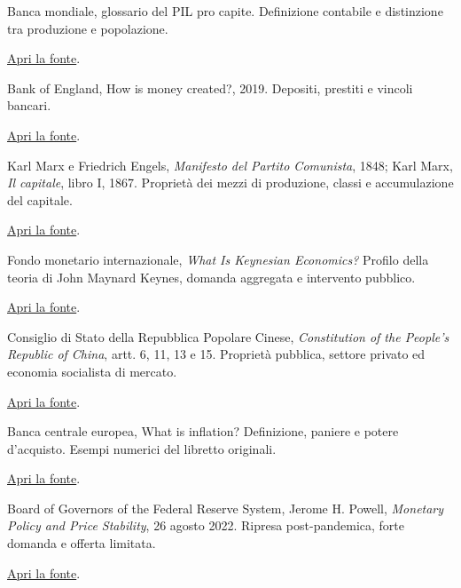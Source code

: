 \begin{enumerate}[label={[\arabic*]},itemsep=8pt]
\item\label{src:pil} Banca mondiale, glossario del PIL pro capite. Definizione contabile e distinzione tra produzione e popolazione.\par\href{https://databank.worldbank.org/metadataglossary/world-development-indicators/series/NY.GDP.PCAP.CN}{\small Apri la fonte}.
\item\label{src:moneta} Bank of England, How is money created?, 2019. Depositi, prestiti e vincoli bancari.\par\href{https://www.bankofengland.co.uk/explainers/how-is-money-created}{\small Apri la fonte}.
\item\label{src:marx} Karl Marx e Friedrich Engels, \emph{Manifesto del Partito Comunista}, 1848; Karl Marx, \emph{Il capitale}, libro I, 1867. Proprietà dei mezzi di produzione, classi e accumulazione del capitale.\par\href{https://www.marxists.org/archive/marx/works/1848/communist-manifesto/}{\small Apri la fonte}.
\item\label{src:keynes} Fondo monetario internazionale, \emph{What Is Keynesian Economics?} Profilo della teoria di John Maynard Keynes, domanda aggregata e intervento pubblico.\par\href{https://www.imf.org/external/pubs/ft/fandd/2014/09/basics.htm}{\small Apri la fonte}.
\item\label{src:costituzionecinese} Consiglio di Stato della Repubblica Popolare Cinese, \emph{Constitution of the People's Republic of China}, artt. 6, 11, 13 e 15. Proprietà pubblica, settore privato ed economia socialista di mercato.\par\href{https://english.www.gov.cn/archive/lawsregulations/201911/20/content_WS5ed8856ec6d0b3f0e9499913.html}{\small Apri la fonte}.
\item\label{src:inflazione} Banca centrale europea, What is inflation? Definizione, paniere e potere d’acquisto. Esempi numerici del libretto originali.\par\href{https://www.ecb.europa.eu/ecb-and-you/explainers/tell-me-more/html/what_is_inflation.en.html}{\small Apri la fonte}.
\item\label{src:postcovid} Board of Governors of the Federal Reserve System, Jerome H. Powell, \emph{Monetary Policy and Price Stability}, 26 agosto 2022. Ripresa post-pandemica, forte domanda e offerta limitata.\par\href{https://www.federalreserve.gov/newsevents/speech/powell20220826a.htm}{\small Apri la fonte}.

\end{enumerate}
